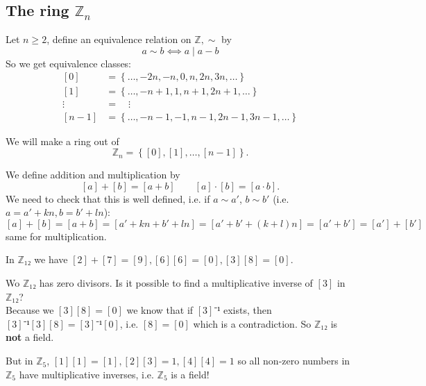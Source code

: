 \documentclass[english]{lbscript}
\begin{document}
\subsection{The ring \(ℤ_n\)}
\label{sec:ring-_n}

Let \(n≥2\), define an equivalence relation on \(ℤ, \sim\) by
\begin{equation}
	\label{eq:100}
	a \sim b ⟺ a \mid a-b
\end{equation}
So we get equivalence classes:
\begin{align*}
	\label{eq:101}
	[0]         & =\left\{ \dots, -2n, -n, 0, n, 2n, 3n, \dots \right\}      \\
	[1]         & =\left\{ \dots, -n+1, 1, n+1, 2n+1, \dots \right\}         \\
	\vdots \;\; & =\quad  \vdots                                             \\
	[n-1]       & = \left\{ \dots, -n-1, -1, n-1, 2n-1, 3n-1, \dots \right\}
\end{align*}

We will make a ring out of
\begin{equation}
	\label{eq:104}
	ℤ_{n}=\left\{ [0], [1], \dots, [n-1] \right\}.
\end{equation}

We define addition and multiplication by
\begin{equation}
	\label{eq:102}
	[a]+[b]=[a+b]\quad \quad [a]⋅[b]=[a⋅b].
\end{equation}
We need to check that this is well defined, i.e. if \(a\sim a'\), \(b\sim b'\) (i.e. \(a=a'+kn, b=b'+ln\)):
\begin{equation}
	\label{eq:103}
	[a] + [b]= [a+b] = [a'+kn+b'+ln]=[a'+b'+(k+l)n]=[a'+b']=[a']+[b']
\end{equation}
same for multiplication.

\begin{example}{}{}
	In \(ℤ₁₂\) we have \([2]+[7]=[9], [6][6]=[0], [3][8]=[0]\).

	Wo \(ℤ₁₂\) has zero divisors. Is it possible to find a multiplicative inverse of \([3]\) in \(ℤ₁₂\)?\\
	Because we \([3][8]=[0]\) we know that if \([3]⁻¹\) exists, then \([3]⁻¹[3][8]=[3]⁻¹[0]\), i.e. \([8]=[0]\) which is a contradiction. So \(ℤ₁₂\) is \textbf{not} a field.

	But in \(ℤ_{5}\), \([1][1]=[1], [2][3]=1, [4][4]=1\) so all non-zero numbers in \(ℤ_{5}\) have multiplicative inverses, i.e. \(ℤ_{5}\) is a field!
\end{example}
\end{document}
